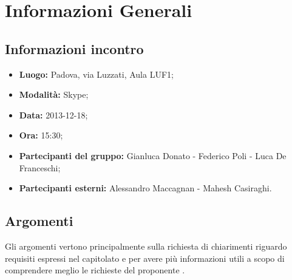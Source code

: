 \section{Informazioni Generali}
	\subsection{Informazioni incontro}
	\begin{itemize}
		\item {\bfseries Luogo:} Padova, via Luzzati, Aula LUF1;
		\item {\bfseries Modalità:} Skype;
		\item {\bfseries Data:} 2013-12-18;
		\item {\bfseries Ora:} 15:30;
		\item {\bfseries Partecipanti del gruppo:} Gianluca Donato - Federico Poli - Luca De Franceschi;
		\item {\bfseries Partecipanti esterni:} Alessandro Maccagnan - Mahesh Casiraghi.
	\end{itemize}
	
	\subsection{Argomenti}
		Gli argomenti vertono principalmente sulla richiesta di chiarimenti riguardo requisiti espressi nel capitolato e per avere più informazioni utili a scopo di comprendere meglio le richieste del proponente \Proponente{}.